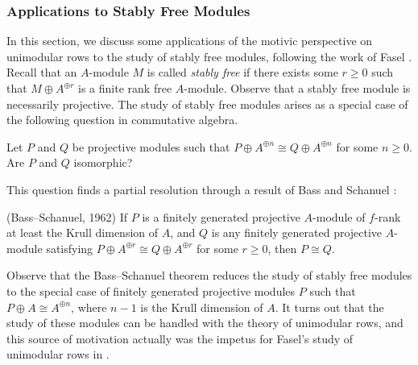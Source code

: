 \subsubsection{Applications to Stably Free Modules} In this section, we discuss some applications of the motivic perspective on unimodular rows to the study of stably free modules, following the work of Fasel \cite[Section 5.2]{Fasel_2010}. Recall that an $A$-module $M$ is called \textit{stably free} if there exists some $r \geq 0$ such that $M \oplus A^{\oplus r}$ is a finite rank free $A$-module. Observe that a stably free module is necessarily projective. The study of stably free modules arises as a special case of the following question in commutative algebra.

\begin{question}
    Let $P$ and $Q$ be projective modules such that $P \oplus A^{\oplus n} \cong Q \oplus A^{\oplus n}$ for some $n \geq 0$. Are $P$ and $Q$ isomorphic?
\end{question}

This question finds a partial resolution through a result of Bass and Schanuel \cite[Theorem 2]{Bass_Schanuel}:

\begin{theorem}(Bass--Schanuel, 1962)
    If $P$ is a finitely generated projective $A$-module of $f$-rank at least the Krull dimension of $A$, and $Q$ is any finitely generated projective $A$-module satisfying $P \oplus A^{\oplus r} \cong Q \oplus A^{\oplus r}$ for some $r \geq 0$, then $P \cong Q$.
\end{theorem}

Observe that the Bass--Schanuel theorem reduces the study of stably free modules to the special case of finitely generated projective modules $P$ such that $P \oplus A \cong A^{\oplus n}$, where $n-1$ is the Krull dimension of $A$. It turns out that the study of these modules can be handled with the theory of unimodular rows, and this source of motivation actually was the impetus for Fasel's study of unimodular rows in \cite{Fasel_2010}. 

